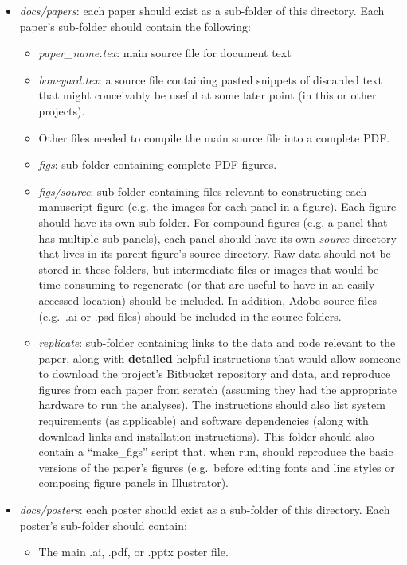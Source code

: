 \documentclass{tufte-book} %
\begin{document}
\begin{itemize}
\item \textit{docs/papers}: each paper should exist as a sub-folder of
  this directory.  Each paper's sub-folder should contain the following:
\begin{itemize}
\item \textit{paper\_name.tex}: main source file for document text
\item \textit{boneyard.tex}: a source file containing pasted snippets of
  discarded text that might conceivably be useful at some later point
  (in this or other projects).
\item Other files needed to compile the main source file into a
  complete PDF.
\item \textit{figs}: sub-folder containing complete PDF figures.
\item \textit{figs/source}: sub-folder containing files relevant to
  constructing each manuscript figure (e.g. the images for each panel
  in a figure).  Each figure should have its own sub-folder.  For compound figures (e.g. a panel that has
  multiple sub-panels), each panel should have its own \textit{source}
  directory that lives in its parent figure's source directory.  Raw
  data should not be stored in these folders, but intermediate files
  or images that would be time consuming to regenerate (or that are
  useful to have in an easily accessed location) should be included.
  In addition, Adobe source files (e.g.\ .ai or .psd files) should be
  included in the source folders.
\item \textit{replicate}: sub-folder containing links to the data and code
  relevant to the paper, along with \textbf{detailed} helpful
  instructions that would allow someone to download the project's
  Bitbucket repository and data, and reproduce figures from each paper
  from scratch (assuming they had the appropriate hardware to run the
  analyses).  The instructions should also list system requirements
  (as applicable) and software dependencies (along with download links
  and installation instructions).  This folder should also contain a
  ``make\_figs'' script that, when run, should reproduce the basic 
  versions of the paper's figures (e.g.\ before editing fonts and line
  styles or composing figure panels in Illustrator).
\end{itemize}
\item \textit{docs/posters}: each poster should exist as a sub-folder
  of this directory.  Each poster's sub-folder should contain:
\begin{itemize}
  \item The main .ai, .pdf, or .pptx poster file.

\end{itemize}
\end{itemize}
\end{document}
